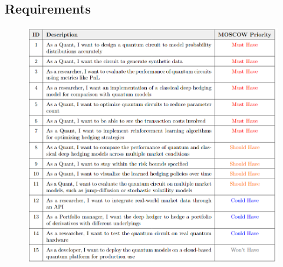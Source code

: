 \documentclass[12pt]{article}
\numberwithin{equation}{section}
\begin{document}
\clearpage
\subsection{Requirements}
\begin{figure}[h]
    \centering
    \includegraphics[scale=1.1, width=\textwidth]{requirements.png}
\end{figure}
\end{document}
